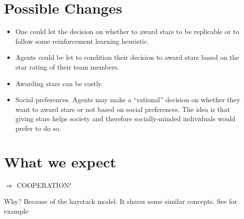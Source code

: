 \documentclass[12pt,a4paper]{article}
\begin{document}
\section{Possible Changes}
\begin{itemize}
	\item One could let the decision on whether to award stars to be replicable or to follow some reinforcement learning heuristic.
	\item Agents could be let to condition their decision to award stars based on the star rating of their team members.
	\item Awarding stars can be costly.
	\item Social preferences. Agents may make a ``rational'' decision on whether they want to award stars or not based on social preferences. The idea is that giving stars helps society and therefore socially-minded individuals would prefer to do so.
\end{itemize}

\section{What we expect}
$\Rightarrow$ COOPERATION! 

Why? Because of the haystack model. It shares some similar concepts.
See for example \cite{SMITH1964} 

\end{document}
